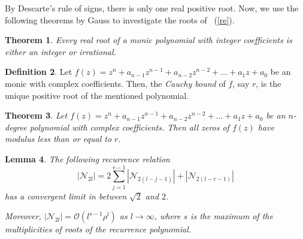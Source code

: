 \documentclass[11pt]{amsart}
\numberwithin{equation}{section}
\newtheorem{theorem}{Theorem}[section]
\newtheorem{lemma}[theorem]{Lemma}
\newtheorem{thm}[theorem]{Theorem}
\theoremstyle{definition}
\newtheorem{defn}[theorem]{Definition}
\newcommand{\eqnref}[1]{~{\textrm(\ref{#1})}}
\numberwithin{equation}{section}
\begin{document}
		
		By Descarte's rule of signs, there is only one real positive root. Now, we use the following theorems by Gauss to investigate the roots of \eqnref{re}. 
		\begin{theorem}\label{4.2}
			Every real root of a monic polynomial with integer coefficients is either an integer or irrational.
		\end{theorem}
		
		\begin{defn}
			Let $f(z)=z^n+a_{n-1}z^{n-1}+a_{n-2}z^{n-2}+\dots +a_1 z+a_0$ be an monic  with complex coefficients. Then, the \textit{Cauchy bound} of $f$, say $r$, is the unique positive root of the mentioned polynomial. 
		\end{defn}
		\begin{thm}\label{4.4}
			Let  $f(z)=z^n+a_{n-1}z^{n-1}+a_{n-2}z^{n-2}+\dots +a_1 z+a_0$  be an $n$-degree polynomial with complex coefficients. Then all zeros of $f(z)$ have modulus less than or equal to $r.$
		\end{thm}
		
		
		
		\begin{lemma}\label{2.7}
			The following recurrence relation   \begin{equation}\label{2.7}
				|\mathcal{N}_{2l}|=2\sum_{j=1}^{r-1}|\mathcal{N}_{2(l-j-1)}|+|\mathcal{N}_{2(l-r-1)}|\end{equation}  has a convergent limit in between $\sqrt{2}$ and $2$.
			
			Moreover, $|\mathcal{N}_{2l}|=\mathcal{O}( l^{s-1}\rho^{l})$ as $l\rightarrow \infty$, where $s$ is the maximum of the multiplicities of roots of the recurrence polynomial.
		\end{lemma}	
		
\end{document}
